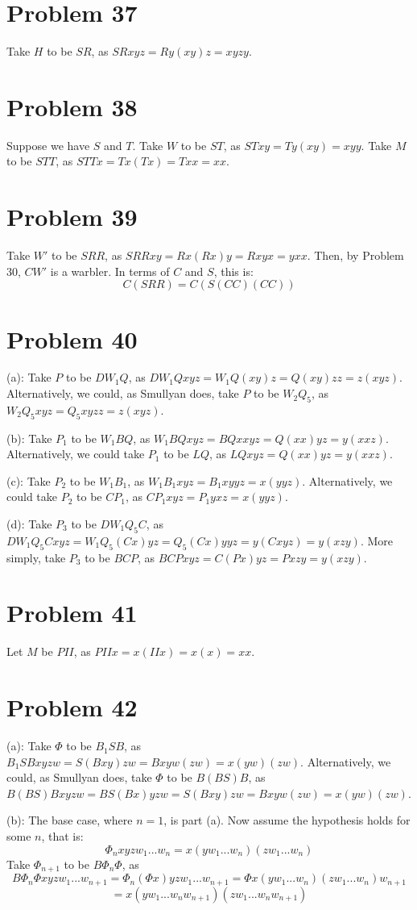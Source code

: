 \documentclass{article}
\theoremstyle{definition}
\begin{document}
\section*{Problem 37}
Take $H$ to be $SR$, as $SRxyz=Ry(xy)z=xyzy$.

\section*{Problem 38}
Suppose we have $S$ and $T$. Take $W$ to be $ST$, as $STxy=Ty(xy)=xyy$. Take $M$ to be $STT$, as $STTx=Tx(Tx)=Txx=xx$.

\section*{Problem 39}
Take $W'$ to be $SRR$, as $SRRxy=Rx(Rx)y=Rxyx=yxx$. Then, by Problem 30, $CW'$ is a warbler. In terms of $C$ and $S$, this is:
\[ C(SRR)=C(S(CC)(CC)) \]

\section*{Problem 40}
(a): Take $P$ to be $DW_1Q$, as $DW_1Qxyz=W_1Q(xy)z=Q(xy)zz=z(xyz)$. Alternatively, we could, as Smullyan does, take $P$ to be 
$W_2Q_5$, as $W_2Q_5xyz=Q_5xyzz=z(xyz)$.


(b): Take $P_1$ to be $W_1BQ$, as $W_1BQxyz=BQxxyz=Q(xx)yz=y(xxz)$. Alternatively, we could take $P_1$ to be $LQ$, as 
$LQxyz=Q(xx)yz=y(xxz)$.


(c): Take $P_2$ to be $W_1B_1$, as $W_1B_1xyz=B_1xyyz=x(yyz)$. Alternatively, we could take $P_2$ to be $CP_1$, as
$CP_1xyz=P_1yxz=x(yyz)$.


(d): Take $P_3$ to be $DW_1Q_5C$, as $DW_1Q_5Cxyz=W_1Q_5(Cx)yz=Q_5(Cx)yyz=y(Cxyz)=y(xzy)$. More simply, take $P_3$ to be 
$BCP$, as $BCPxyz=C(Px)yz=Pxzy=y(xzy)$. 

\section*{Problem 41}
Let $M$ be $PII$, as $PIIx=x(IIx)=x(x)=xx$.

\section*{Problem 42}
(a): Take $\Phi$ to be $B_1SB$, as $B_1SBxyzw=S(Bxy)zw=Bxyw(zw)=x(yw)(zw)$. Alternatively, we could, as Smullyan does, take $\Phi$ to be $B(BS)B$, 
as $B(BS)Bxyzw=BS(Bx)yzw=S(Bxy)zw=Bxyw(zw)=x(yw)(zw)$.


(b): The base case, where $n=1$, is part (a). Now assume the hypothesis holds for some $n$, that is:
\[ \Phi_nxyzw_1...w_n=x(yw_1...w_n)(zw_1...w_n) \]
Take $\Phi_{n+1}$ to be $B\Phi_n\Phi$, as 
\[ B\Phi_n\Phi xyzw_1...w_{n+1}=\Phi_n(\Phi x)yzw_1...w_{n+1}=\Phi x(yw_1...w_n)(zw_1...w_n)w_{n+1} \]
\[ =x(yw_1...w_nw_{n+1})(zw_1...w_nw_{n+1}) \]
\end{document}
